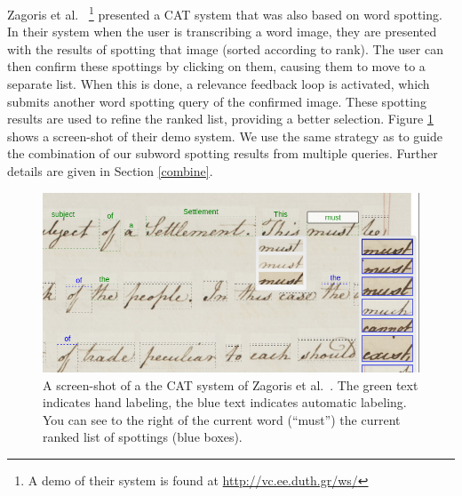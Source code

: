 \documentclass[ms,electronic,twosidetoc,letterpaper,chaptercenter,parttop,lol,lof,lot]{byumsphd}
\begin{document}
Zagoris et al.~\cite{Zagoris2015} \footnote{A demo of their system is found at \url{http://vc.ee.duth.gr/ws/}} presented a CAT system that was also based on word spotting. In their system when the user is transcribing a word image, they are presented with the results of spotting that image (sorted according to rank). The user can then confirm these spottings by clicking on them, causing them to move to a separate list. When this is done, a relevance feedback loop is activated, which submits another word spotting query of the confirmed image. These spotting results are used to refine the ranked list, providing a better selection. Figure \ref{fig:zagoris} shows a screen-shot of their demo system.
We use the same strategy as \cite{Zagoris2015} to guide the combination of our subword spotting results from multiple queries. Further details are given in Section \ref{combine}.

\begin{figure}
    \centering
    \includegraphics[width=.85\textwidth]{zagoris}
    \caption{A screen-shot of a the CAT system of Zagoris et al.~\cite{Zagoris2015}. The green text indicates hand labeling, the blue text indicates automatic labeling. You can see to the right of the current word (``must'') the current ranked list of spottings (blue boxes).}
    \label{fig:zagoris}
\end{figure}
\end{document}
